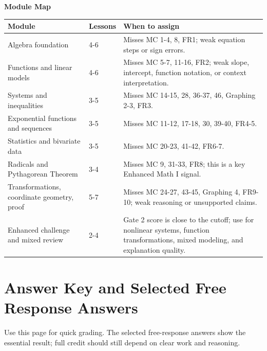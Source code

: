 \documentclass[11pt]{article}
\renewcommand{\arraystretch}{1.18}
\begin{document}
\newpage
\begin{sectionNote}
\textbf{Module Map}
\end{sectionNote}
\begin{center}
\renewcommand{\arraystretch}{1.25}
\begin{tabular}{|L{4.0cm}|L{2.1cm}|L{7.0cm}|}
\hline
\textbf{Module} & \textbf{Lessons} & \textbf{When to assign}\\
\hline
Algebra foundation & 4-6 & Misses MC 1-4, 8, FR1; weak equation steps or sign errors.\\
\hline
Functions and linear models & 4-6 & Misses MC 5-7, 11-16, FR2; weak slope, intercept, function notation, or context interpretation.\\
\hline
Systems and inequalities & 3-5 & Misses MC 14-15, 28, 36-37, 46, Graphing 2-3, FR3.\\
\hline
Exponential functions and sequences & 3-5 & Misses MC 11-12, 17-18, 30, 39-40, FR4-5.\\
\hline
Statistics and bivariate data & 3-5 & Misses MC 20-23, 41-42, FR6-7.\\
\hline
Radicals and Pythagorean Theorem & 3-4 & Misses MC 9, 31-33, FR8; this is a key Enhanced Math I signal.\\
\hline
Transformations, coordinate geometry, proof & 5-7 & Misses MC 24-27, 43-45, Graphing 4, FR9-10; weak reasoning or unsupported claims.\\
\hline
Enhanced challenge and mixed review & 2-4 & Gate 2 score is close to the cutoff; use for nonlinear systems, function transformations, mixed modeling, and explanation quality.\\
\hline
\end{tabular}
\end{center}

\newpage
\section*{Answer Key and Selected Free Response Answers}
\begin{sectionNote}
Use this page for quick grading. The selected free-response answers show the essential result; full credit should still depend on clear work and reasoning.
\end{sectionNote}
\end{document}
